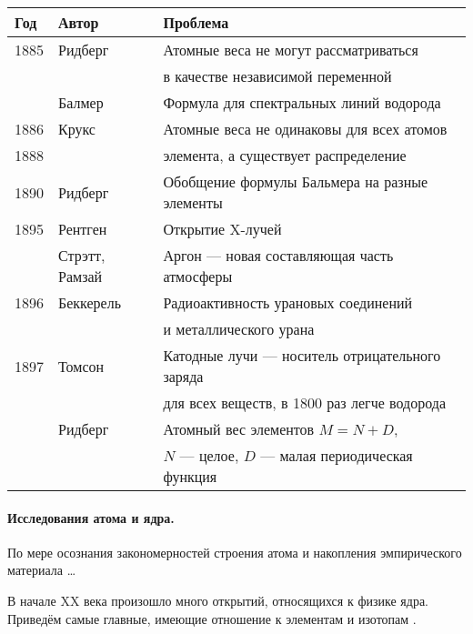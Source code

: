 \documentclass[a5paper,openany]{book}
\begin{document}
{\small	
		\begin{tabular}{l|l|l}
			Год & Автор	& Проблема \\
			\hline
			1885 & Ридберг & {\color{red}Атомные веса не могут рассматриваться} \\
			~ & ~ & {\color{red} в качестве независимой переменной} \\	
			~ & Балмер & Формула для спектральных линий водорода \\	
			1886 & Крукс & {\color{red}Атомные веса не одинаковы для всех атомов } \\
			1888 & ~ &   {\color{red}элемента, а существует распределение }\\
			1890 & Ридберг & Обобщение формулы Бальмера на разные элементы \\	
			1895 & Рентген & Открытие X-лучей \\
			~ & Стрэтт, Рамзай & Аргон --- новая составляющая часть атмосферы \\
			1896 & Беккерель & Радиоактивность урановых соединений  \\
			~ & ~ &  и металлического урана\\
			1897 & Томсон & Катодные лучи --- носитель отрицательного заряда  \\
			~ & ~ &  для всех веществ, в 1800 раз легче водорода\\	
			~ & Ридберг & {\color{red}Атомный вес элементов $M = N+D$,} \\	
			~ & ~ &  {\color{red}$N$ --- целое, $D$ --- малая периодическая функция}\\			
			\hline
		\end{tabular}
	}
	
	\paragraph{Исследования атома и ядра.} По мере осознания закономерностей строения атома и накопления эмпирического материала \ldots
	







В начале XX века произошло много открытий, относящихся к физике ядра. Приведём самые главные, имеющие отношение к элементам и изотопам \cite{Bekman}.
\end{document}
